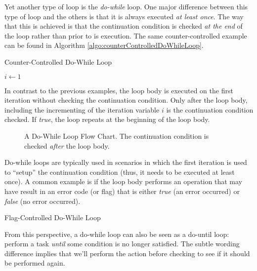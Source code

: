 Yet another type of loop is the \emph{do-while} loop.  One major difference between this
type of loop and the others is that it is always executed \emph{at least once}.  The way that
this is achieved is that the continuation condition is checked \emph{at the end} of the loop
rather than prior to is execution.  The same counter-controlled example can be found in
Algorithm \ref{algo:counterControlledDoWhileLoop}.

\begin{algorithm}[h]
\caption{Counter-Controlled Do-While Loop}
\label{algo:counterControlledDoWhileLoop}
$i \leftarrow 1$ \;
\end{algorithm}

In contrast to the previous examples, the loop body is executed on the first iteration without
checking the continuation condition.  Only after the loop body, including the incrementing of 
the iteration variable $i$ is the continuation condition checked.  If \emph{true}, the loop repeats
at the beginning of the loop body.

\begin{figure}[!h]
\centering

\caption{A Do-While Loop Flow Chart.  The continuation condition is checked \emph{after} the loop body.}
\label{figure:doWhileLoopFlowChart}
\end{figure}

Do-while loops are typically used in scenarios in which the first iteration is used to ``setup'' 
the continuation condition (thus, it needs to be executed at least once).  A common example
is if the loop body performs an operation that may have result in an error code (or flag) that is
either \emph{true} (an error occurred) or \emph{false} (no error occurred).  

\begin{algorithm}[h]
\caption{Flag-Controlled Do-While Loop}
\label{algo:flagControlledDoWhileLoop}
\end{algorithm}

From this perspective, a do-while loop can also be seen as a do-until loop: perform a task
\emph{until} some condition is no longer satisfied.  The subtle wording difference implies that
we'll perform the action before checking to see if it should be performed again.

